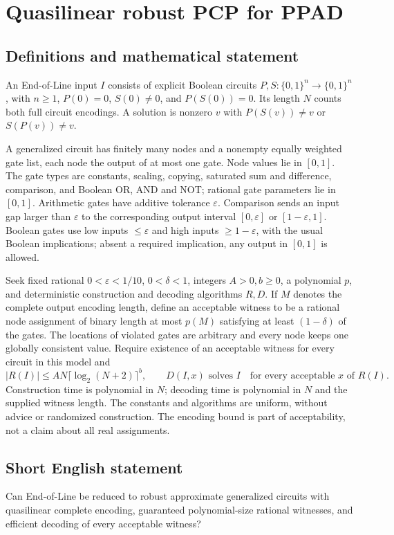 \documentclass[11pt]{article}
\begin{document}
\section*{Quasilinear robust PCP for PPAD}\label{30007479}
\subsection{Definitions and mathematical statement}
An End-of-Line input $I$ consists of explicit Boolean circuits $P,S:\{0,1\}^n\to\{0,1\}^n$, with $n\ge1$, $P(0)=0$, $S(0)\ne0$, and $P(S(0))=0$. Its length $N$ counts both full circuit encodings. A solution is nonzero $v$ with $P(S(v))\ne v$ or $S(P(v))\ne v$.

A generalized circuit has finitely many nodes and a nonempty equally weighted gate list, each node the output of at most one gate. Node values lie in $[0,1]$. The gate types are constants, scaling, copying, saturated sum and difference, comparison, and Boolean OR, AND and NOT; rational gate parameters lie in $[0,1]$. Arithmetic gates have additive tolerance $\varepsilon$. Comparison sends an input gap larger than $\varepsilon$ to the corresponding output interval $[0,\varepsilon]$ or $[1-\varepsilon,1]$. Boolean gates use low inputs $\le\varepsilon$ and high inputs $\ge1-\varepsilon$, with the usual Boolean implications; absent a required implication, any output in $[0,1]$ is allowed.

Seek fixed rational $0<\varepsilon<1/10$, $0<\delta<1$, integers $A>0,b\ge0$, a polynomial $p$, and deterministic construction and decoding algorithms $R,D$. If $M$ denotes the complete output encoding length, define an acceptable witness to be a rational node assignment of binary length at most $p(M)$ satisfying at least $(1-\delta)$ of the gates. The locations of violated gates are arbitrary and every node keeps one globally consistent value. Require existence of an acceptable witness for every circuit in this model and
\[
 |R(I)|\le AN\lceil\log_2(N+2)\rceil^b,\qquad
 D(I,x)\text{ solves }I\quad\text{for every acceptable }x\text{ of }R(I).
\]
Construction time is polynomial in $N$; decoding time is polynomial in $N$ and the supplied witness length. The constants and algorithms are uniform, without advice or randomized construction. The encoding bound is part of acceptability, not a claim about all real assignments.

\subsection{Short English statement}
Can End-of-Line be reduced to robust approximate generalized circuits with quasilinear complete encoding, guaranteed polynomial-size rational witnesses, and efficient decoding of every acceptable witness?
\end{document}
